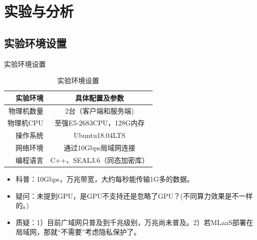 \documentclass{beamer}
\begin{document}

\section{实验与分析}
\subsection{实验环境设置}
\begin{frame}{实验环境设置}
\begin{table}[htpb]
            \centering
            \caption{实验环境设置}
            \label{tab:number}
            \begin{tabular}{rc}\toprule
                实验环境 & 具体配置及参数 \\\midrule
                物理机数量 & 2台（客户端和服务端)\\
                物理机CPU & 至强E5-2683CPU，128G内存\\
                操作系统 & Ubuntu18.04LTS\\
                网络环境 & 通过10Gbps局域网连接 \\
                编程语言 & C++、SEAL3.6（同态加密库）\\\bottomrule
            \end{tabular}
\end{table}
\begin{itemize}
	\item {\footnotesize 科普：10Gbps，万兆带宽，大约每秒能传输1G多的数据。}
	\item {\footnotesize \color{blue} 疑问：未提到GPU，是GPU不支持还是忽略了GPU？(不同算力效果是不一样的。)}
	\item {\footnotesize \color{blue} 质疑：1）目前广域网只普及到千兆级别，万兆尚未普及。2）若MLaaS部署在局域网，那就“不需要”考虑隐私保护了。}
\end{itemize}  
\end{frame}
\end{document}
